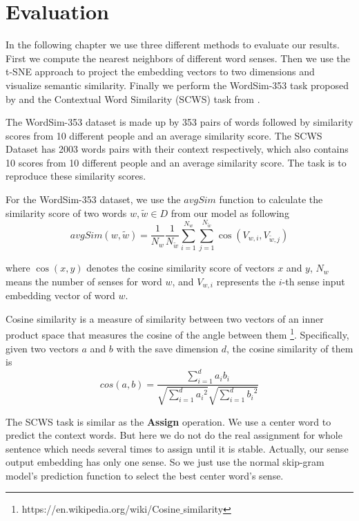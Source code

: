 \chapter{Evaluation}
\label{cha:evaluation}


In the following chapter we use three different methods to evaluate our results. First we compute the nearest neighbors of different word senses. Then we use the t-SNE approach to project the embedding vectors to two dimensions and visualize semantic similarity. Finally we perform the  WordSim-353 task proposed by \cite{FinkelsteinGabrilovichEtAl2001} and the Contextual Word Similarity (SCWS) task from \cite{HuangSocherEtAl2012}.

The WordSim-353 dataset is made up by 353 pairs of words followed by similarity scores from 10 different people and an average similarity score. The SCWS Dataset has 2003 words pairs with their context respectively, which also contains 10 scores from 10 different people and an average similarity score. The task is to reproduce these similarity scores. 

For the WordSim-353 dataset, we use the $avgSim$ function to calculate the similarity score of two words $w,\tilde{w}\in D$ from our model as following
\begin{equation}
avgSim(w,\tilde{w})
=\frac{1}{N_w}\frac{1}{N_{\tilde{w}}}\sum_{i=1}^{N_w}\sum_{j=1}^{N_{\tilde{w}}}\cos(V_{w,i},V_{\tilde{w},j})
\end{equation}

where $\cos(x, y)$ denotes the cosine similarity score of vectors $x$ and $y$, $N_w$ means the number of senses for word $w$, and $V_{w,i}$ represents the $i$-th sense input embedding vector of word $w$. 

Cosine similarity is a measure of similarity between two vectors of an inner product space that measures the cosine of the angle between them \footnote{https://en.wikipedia.org/wiki/Cosine$\_$similarity}. Specifically, given two vectors $a$ and $b$ with the save dimension $d$, the cosine similarity of them is
$$cos(a,b)=\frac{\sum_{i=1}^d a_i b_i}{\sqrt{\sum_{i=1}^d {a_i}^2}\sqrt{\sum_{i=1}^d {b_i}^2}}$$

The SCWS task is similar as the \textbf{Assign} operation. We use a center word to predict the context words. But here we do not do the real assignment for whole sentence which needs several times to assign until it is stable. Actually, our sense output embedding has only one sense. So we just use the normal skip-gram model's prediction function to select the best center word's sense.


